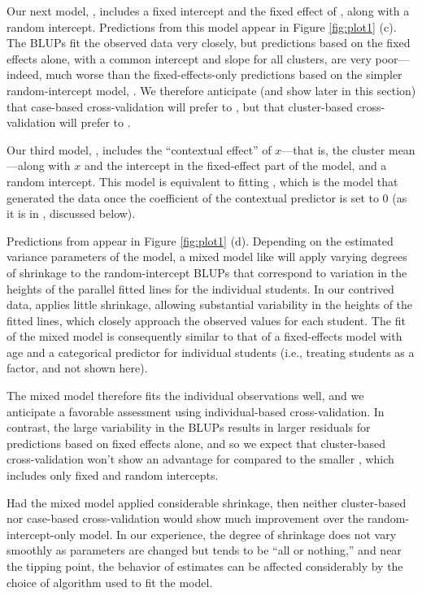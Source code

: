 \documentclass[
]{jss}
\begin{document}
Our next model, , includes a fixed intercept and the fixed
effect of , along with a random intercept. Predictions from this
model appear in Figure \ref{fig:plot1} (c). The BLUPs fit the observed
data very closely, but predictions based on the fixed effects alone,
with a common intercept and slope for all clusters, are very
poor---indeed, much worse than the fixed-effects-only predictions based
on the simpler random-intercept model, . We therefore
anticipate (and show later in this section) that case-based
cross-validation will prefer  to , but that
cluster-based cross-validation will prefer  to .

Our third model, , includes the ``contextual effect'' of
\(x\)---that is, the cluster mean ---along with \(x\) and the
intercept in the fixed-effect part of the model, and a random intercept.
This model is equivalent to fitting
, which is the model that
generated the data once the coefficient of the contextual predictor
 is set to 0 (as it is in , discussed below).

Predictions from  appear in Figure \ref{fig:plot1} (d).
Depending on the estimated variance parameters of the model, a mixed
model like  will apply varying degrees of shrinkage to the
random-intercept BLUPs that correspond to variation in the heights of
the parallel fitted lines for the individual students. In our contrived
data,  applies little shrinkage, allowing substantial
variability in the heights of the fitted lines, which closely approach
the observed values for each student. The fit of the mixed model
 is consequently similar to that of a fixed-effects model
with age and a categorical predictor for individual students (i.e.,
treating students as a factor, and not shown here).

The mixed model  therefore fits the individual observations
well, and we anticipate a favorable assessment using individual-based
cross-validation. In contrast, the large variability in the BLUPs
results in larger residuals for predictions based on fixed effects
alone, and so we expect that cluster-based cross-validation won't show
an advantage for  compared to the smaller ,
which includes only fixed and random intercepts.

Had the mixed model applied considerable shrinkage, then neither
cluster-based nor case-based cross-validation would show much
improvement over the random-intercept-only model. In our experience, the
degree of shrinkage does not vary smoothly as parameters are changed but
tends to be ``all or nothing,'' and near the tipping point, the behavior
of estimates can be affected considerably by the choice of algorithm
used to fit the model.
\end{document}

